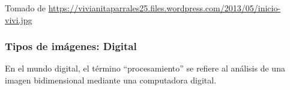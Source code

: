 \documentclass[
10pt, %
aspectratio=169, %
]{beamer}
\begin{document}
\begin{frame}
\begin{minipage}{.55\textwidth}
			{\scriptsize Tomado de \url{https://vivianitaparrales25.files.wordpress.com/2013/05/inicio-vivi.jpg}}
		\end{minipage}
		
	\end{frame}
	
	\begin{frame}
		
		\frametitle{Tipos de imágenes: Digital}
		
		\noindent\begin{minipage}{.5\textwidth}
			
			En el mundo digital, el término ``procesamiento'' se refiere al análisis de una imagen bidimensional mediante una computadora digital. \\[2mm]
						
			

\end{minipage}
\end{frame}
\end{document}
